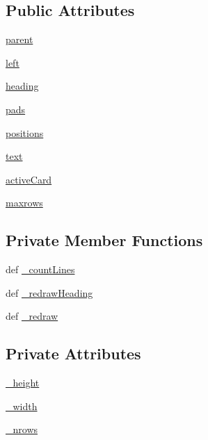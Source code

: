 \subsection*{Public Attributes}
\begin{DoxyCompactItemize}
\item 
\hyperlink{classcurseshelpers_1_1TabbedText_ae734a2a09a601a030ab7fed8f90f05da}{parent}
\item 
\hyperlink{classcurseshelpers_1_1TabbedText_ac2952af217f6e87bccb6a3f2666f08c7}{left}
\item 
\hyperlink{classcurseshelpers_1_1TabbedText_a4684c498d6ff08fd96a94ecaf472d20a}{heading}
\item 
\hyperlink{classcurseshelpers_1_1TabbedText_a030191d2d02c0688144699d6ae68f604}{pads}
\item 
\hyperlink{classcurseshelpers_1_1TabbedText_ab0791883abbe6bab53eb5b16213a7cdb}{positions}
\item 
\hyperlink{classcurseshelpers_1_1TabbedText_aaf77caf316afc23cdd484c1b05f6320f}{text}
\item 
\hyperlink{classcurseshelpers_1_1TabbedText_a4b7f6d73feca48188abffff0dfb447b4}{active\-Card}
\item 
\hyperlink{classcurseshelpers_1_1TabbedText_a2edaa23ac8df49ba00cd1d2a019cf4c9}{maxrows}
\end{DoxyCompactItemize}
\subsection*{Private Member Functions}
\begin{DoxyCompactItemize}
\item 
def \hyperlink{classcurseshelpers_1_1TabbedText_a9db4ff50aa8291dad251d51b7b147a9f}{\-\_\-count\-Lines}
\item 
def \hyperlink{classcurseshelpers_1_1TabbedText_a38bd8c1f08e8ecf34aa33f509dfe81cd}{\-\_\-redraw\-Heading}
\item 
def \hyperlink{classcurseshelpers_1_1TabbedText_a9144f6814bed95b1977f54d124b70303}{\-\_\-redraw}
\end{DoxyCompactItemize}
\subsection*{Private Attributes}
\begin{DoxyCompactItemize}
\item 
\hyperlink{classcurseshelpers_1_1TabbedText_aef8f97a70ffe232d5870620d508efdef}{\-\_\-height}
\item 
\hyperlink{classcurseshelpers_1_1TabbedText_a90bd899074e31cd69893192f4514d88b}{\-\_\-width}
\item 
\hyperlink{classcurseshelpers_1_1TabbedText_a0da10da4cf0016587017d394cb786dce}{\-\_\-nrows}
\end{DoxyCompactItemize}



